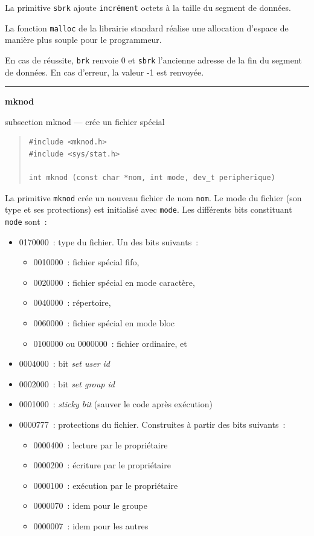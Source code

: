 \documentclass [twoside] {report}
\newcommand {\primitive} [1]
    {
	\phantomsection
	{\large \textbf {#1}}
	\addcontentsline {toc} {subsection} {#1}
    }
\newcommand {\separation}
    {
	\vspace {5mm}
	\nopagebreak
	\hrule
    }
\begin{document}
La primitive \texttt {sbrk} ajoute \texttt {incrément} octets à la taille du
segment de données.

La fonction \texttt {malloc} de la librairie standard réalise une allocation
d'espace de manière plus souple pour le programmeur.

En cas de réussite, \texttt {brk} renvoie 0 et \texttt {sbrk} l'ancienne adresse
de la fin du segment de données.  En cas d'erreur, la valeur -1 est
renvoyée.




\separation
\primitive {mknod} --- crée un fichier spécial

\begin {quote}
\begin {verbatim}
#include <mknod.h>
#include <sys/stat.h>

int mknod (const char *nom, int mode, dev_t peripherique)
\end{verbatim}
\end {quote}

La primitive \texttt {mknod} crée un nouveau fichier de
nom \texttt {nom}. Le mode du fichier (son type et ses
protections) est initialisé avec \texttt {mode}. Les
différents bits constituant \texttt {mode} sont~:

\begin {itemize}
    \item 0170000~: type du fichier. Un des bits suivants~:
	\begin {itemize}
	    \item 0010000~: fichier spécial fifo,
	    \item 0020000~: fichier spécial en mode caractère,
	    \item 0040000~: répertoire,
	    \item 0060000~: fichier spécial en mode bloc
	    \item 0100000 ou 0000000~: fichier ordinaire, et
	\end {itemize}
    \item 0004000~: bit \textit {set user id}
    \item 0002000~: bit \textit {set group id}
    \item 0001000~: \textit {sticky bit} (sauver le code après exécution)
    \item 0000777~: protections du fichier. Construites
	à partir des bits suivants~:
	\begin {itemize}
	    \item 0000400~: lecture par le propriétaire
	    \item 0000200~: écriture par le propriétaire
	    \item 0000100~: exécution par le propriétaire
	    \item 0000070~: idem pour le groupe
	    \item 0000007~: idem pour les autres
	\end {itemize}
\end {itemize}
\end{document}

